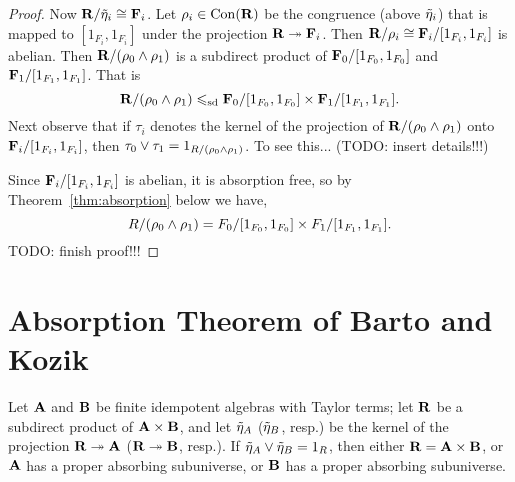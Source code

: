 \begin{proof}
Now $\mathbf{R}/\tilde{\eta}_i \cong \mathbf{F}_i$.  Let $\rho_i \in \operatorname{Con}(\mathbf{R})$ be the congruence
(above $\tilde{\eta}_i$) that is mapped to $[1_{F_i}, 1_{F_i}]$ under the projection 
$\mathbf{R} \twoheadrightarrow \mathbf{F}_i$.  Then $\mathbf{R}/\rho_i \cong \mathbf{F}_i/[1_{F_i}, 1_{F_i}]$ is abelian.
Then $\mathbf{R}/(\rho_0\wedge \rho_1)$ is a subdirect product of $\mathbf{F}_0/[1_{F_0}, 1_{F_0}]$ and 
$\mathbf{F}_1/[1_{F_1}, 1_{F_1}]$.  That is
\[
\mathbf{R}/(\rho_0\wedge \rho_1) \leqslant_{\mathrm{sd}} \mathbf{F}_0/[1_{F_0}, 1_{F_0}] \times 
\mathbf{F}_1/[1_{F_1}, 1_{F_1}].
\]
Next observe that if $\tau_i$ denotes the kernel of the projection of 
$\mathbf{R}/(\rho_0\wedge \rho_1)$ onto $\mathbf{F}_i/[1_{F_i}, 1_{F_i}]$, then 
$\tau_0\vee \tau_1 = 1_{R/(\rho_0\wedge \rho_1)}$. To see this... (TODO:
insert details!!!)

Since $\mathbf{F}_i/[1_{F_i}, 1_{F_i}]$ is abelian, it is absorption free, so
by Theorem~\ref{thm:absorption} below we have,
\begin{equation}
  \label{eq:101010}
R/(\rho_0\wedge \rho_1) = F_0/[1_{F_0}, 1_{F_0}] \times 
F_1/[1_{F_1}, 1_{F_1}].
\end{equation}
TODO: finish proof!!!

\vfill

\end{proof}




\appendix

\section{Absorption Theorem of Barto and Kozik}
\begin{theorem}
\label{thm:absorption}
Let $\mathbf{A}$ and $\mathbf{B}$ be finite
idempotent algebras with Taylor terms; let $\mathbf{R}$ be a subdirect product of
$\mathbf{A} \times \mathbf{B}$, and let $\tilde{\eta}_A$ ($\tilde{\eta}_B$, resp.) be the kernel of the
projection $\mathbf{R} \twoheadrightarrow \mathbf{A}$ ($\mathbf{R} \twoheadrightarrow \mathbf{B}$, resp.).
If $\tilde{\eta}_A \vee \tilde{\eta}_B = 1_R$, then either $\mathbf{R} = \mathbf{A} \times \mathbf{B}$, or
$\mathbf{A}$ has a proper absorbing subuniverse, or $\mathbf{B}$ has a proper absorbing subuniverse.
\end{theorem}


